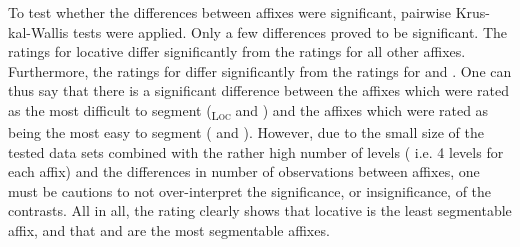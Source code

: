 \begin{table}[h!]

	\caption{Semantic Transparency Rating  by affix }
	\label{tbl:Corpus distribution semantic transparency rating}

	\begin{center}
\vspace*{-0.2cm}
	\end{center}
\end{table}




To test whether the differences between affixes were significant, pairwise Krus-kal-Wallis tests were applied.  Only a few differences proved to be significant. The ratings for locative  differ significantly from the ratings for all other affixes. Furthermore, the ratings for  differ significantly from the ratings for  and . 
One can thus say that there is a significant difference between the affixes which were rated as the most difficult to segment (\textsubscript{\textsc{Loc}} and ) and the affixes which were rated as being the most easy to segment ( and ). However, due to the small size of the tested data sets combined with the rather high number of levels ( i.e. 4 levels for each affix) and the differences in number of observations between affixes, one must be cautions to not over-interpret the significance, or insignificance, of the contrasts. 
All in all, the rating clearly shows that locative  is the least segmentable affix, and that  and  are the most segmentable affixes.



